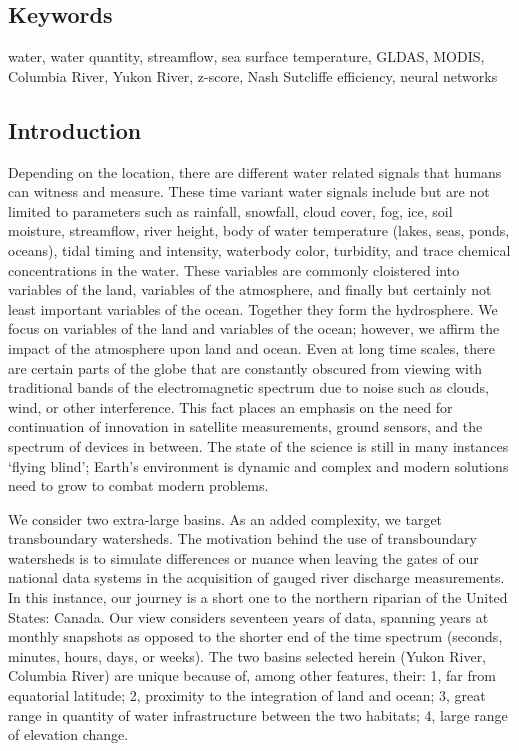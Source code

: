 \begin{refsection}
\subsection{Keywords}
water, water quantity, streamflow, sea surface temperature, GLDAS, MODIS, Columbia River, Yukon River, z-score, Nash Sutcliffe efficiency, neural networks

\subsection{Introduction}
Depending on the location, there are different water related signals that humans can witness and measure. These time variant water signals include but are not limited to parameters such as rainfall, snowfall, cloud cover, fog, ice, soil moisture, streamflow, river height, body of water temperature (lakes, seas, ponds, oceans), tidal timing and intensity, waterbody color, turbidity, and trace chemical concentrations in the water. These variables are commonly cloistered into variables of the land, variables of the atmosphere, and finally but certainly not least important variables of the ocean. Together they form the hydrosphere. We focus on variables of the land and variables of the ocean; however, we affirm the impact of the atmosphere upon land and ocean. Even at long time scales, there are certain parts of the globe that are constantly obscured from viewing with traditional bands of the electromagnetic spectrum due to noise such as clouds, wind, or other interference. This fact places an emphasis on the need for continuation of innovation in satellite measurements, ground sensors, and the spectrum of devices in between. The state of the science is still in many instances ‘flying blind’; Earth’s environment is dynamic and complex and modern solutions need to grow to combat modern problems. 

We consider two extra-large basins. As an added complexity, we target transboundary watersheds. The motivation behind the use of transboundary watersheds is to simulate differences or nuance when leaving the gates of our national data systems in the acquisition of gauged river discharge measurements. In this instance, our journey is a short one to the northern riparian of the United States: Canada. Our view considers seventeen years of data, spanning years at monthly snapshots as opposed to the shorter end of the time spectrum (seconds, minutes, hours, days, or weeks). The two basins selected herein (Yukon River, Columbia River) are unique because of, among other features, their: 1, far from equatorial latitude; 2, proximity to the integration of land and ocean; 3, great range in quantity of water infrastructure between the two habitats; 4, large range of elevation change.


\end{refsection}
